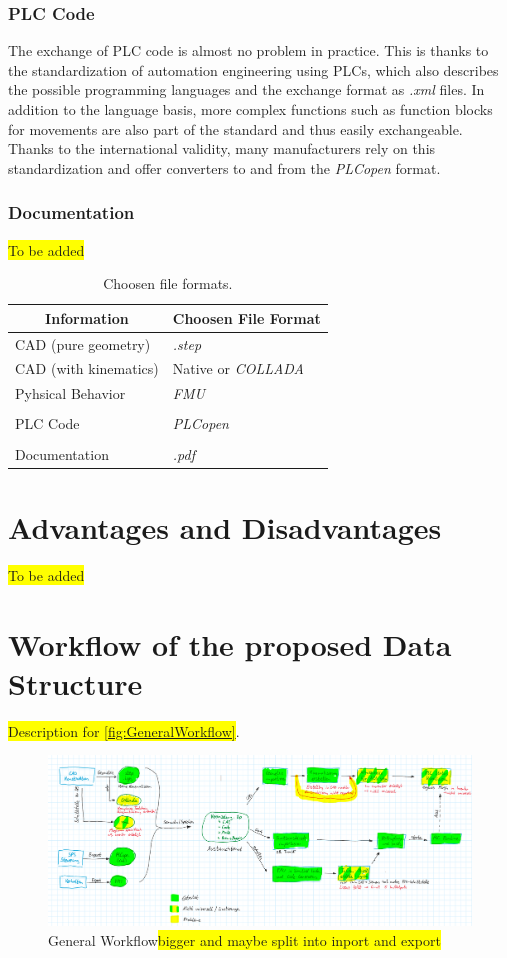 \subsubsection{PLC Code}
	The exchange of PLC code is almost no problem in practice. This is thanks to the standardization of automation engineering using PLCs, which also describes the possible programming languages and the exchange format as \textit{.xml} files. In addition to the language basis, more complex functions such as function blocks for movements are also part of the standard and thus easily exchangeable. Thanks to the international validity, many manufacturers rely on this standardization and offer converters to and from the \textit{PLCopen} format. \\

\subsubsection{Documentation}
\colorbox{yellow}{To be added}


\begin{table}[htp]
	\scriptsize
	\centering
	\caption{Choosen file formats.}
	\begin{tabular}{ll}
		\toprule
		 \multicolumn{1}{c}{Information} & \multicolumn{1}{c}{Choosen File Format}\\
		 \midrule
		 CAD (pure geometry) & \textit{.step}\\
		 CAD (with kinematics) & Native or \textit{COLLADA}  \\
		 Pyhsical Behavior & \textit{FMU}\\
		 & \\
		 PLC Code & \textit{PLCopen} \\
		 & \\
		 Documentation & \textit{.pdf}\\
		 \bottomrule
	\end{tabular}	
	\label{tab:InformationAndFormats}
\end{table}



\section{Advantages and Disadvantages}
\colorbox{yellow}{To be added}


\section{Workflow of the proposed Data Structure}
\colorbox{yellow}{Description for \autoref{fig:GeneralWorkflow}}. 

\begin{figure}[htp]
	\centering
	\includegraphics[width=.9\linewidth]{figures/GeneralWorkflow.PNG}
	\caption{General Workflow\colorbox{yellow}{bigger and maybe split into inport and export}}
	\label{fig:GeneralWorkflow}
\end{figure}


